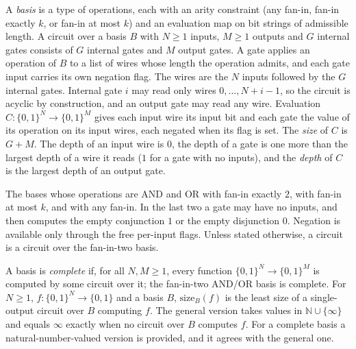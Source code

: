 \begin{definition}
  \label{def:circuit}
  \leanok
  A \emph{basis} is a type of operations, each with an arity constraint (any
  fan-in, fan-in exactly $k$, or fan-in at most $k$) and an evaluation map on
  bit strings of admissible length. A circuit over a basis $B$ with $N \ge 1$
  inputs, $M \ge 1$ outputs and $G$ internal gates consists of $G$ internal
  gates and $M$ output gates. A gate applies an operation of $B$ to a list of
  wires whose length the operation admits, and each gate input carries its own
  negation flag. The wires are the $N$ inputs followed by the $G$ internal
  gates. Internal gate $i$ may read only wires $0, \dots, N + i - 1$, so the
  circuit is acyclic by construction, and an output gate may read any wire.
  Evaluation $C : \{0,1\}^N \to \{0,1\}^M$ gives each input wire its input bit
  and each gate the value of its operation on its input wires, each negated
  when its flag is set. The \emph{size} of $C$ is $G + M$. The depth of an
  input wire is $0$, the depth of a gate is one more than the largest depth of
  a wire it reads ($1$ for a gate with no inputs), and the \emph{depth} of $C$
  is the largest depth of an output gate.
\end{definition}

\begin{definition}
  \label{def:circuits-bases}
  \leanok
  The bases whose operations are AND and OR with fan-in exactly $2$, with
  fan-in at most $k$, and with any fan-in. In the last two a gate may have no
  inputs, and then computes the empty conjunction $1$ or the empty disjunction
  $0$. Negation is available only through the free per-input flags. Unless
  stated otherwise, a circuit is a circuit over the fan-in-two basis.
\end{definition}

\begin{definition}
  \label{def:circuits-size-complexity}
  \leanok
  A basis is \emph{complete} if, for all $N, M \ge 1$, every function
  $\{0,1\}^N \to \{0,1\}^M$ is computed by some circuit over it; the fan-in-two
  AND/OR basis is complete. For $N \ge 1$, $f : \{0,1\}^N \to \{0,1\}$ and a
  basis $B$, $\mathrm{size}_B(f)$ is the least size of a single-output circuit
  over $B$ computing $f$. The general version takes values in
  $\mathbb{N} \cup \{\infty\}$ and equals $\infty$ exactly when no circuit over
  $B$ computes $f$. For a complete basis a natural-number-valued version is
  provided, and it agrees with the general one.
\end{definition}

